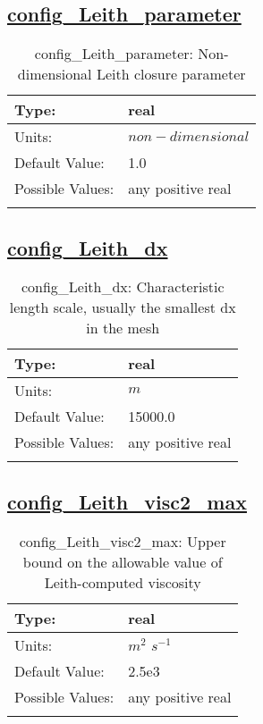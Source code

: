 \subsection[config\_Leith\_parameter]{\hyperref[sec:nm_tab_hmix_Leith]{config\_Leith\_parameter}}
\label{subsec:nm_sec_config_Leith_parameter}
\begin{center}
\begin{longtable}{| p{2.0in} | p{4.0in} |}
    \hline
    Type: & real \\
    \hline
    Units: & $non-dimensional$ \\
    \hline
    Default Value: & 1.0 \\
    \hline
    Possible Values: & any positive real \\
    \hline
    \caption{config\_Leith\_parameter: Non-dimensional Leith closure parameter}
\end{longtable}
\end{center}
\subsection[config\_Leith\_dx]{\hyperref[sec:nm_tab_hmix_Leith]{config\_Leith\_dx}}
\label{subsec:nm_sec_config_Leith_dx}
\begin{center}
\begin{longtable}{| p{2.0in} | p{4.0in} |}
    \hline
    Type: & real \\
    \hline
    Units: & $m$ \\
    \hline
    Default Value: & 15000.0 \\
    \hline
    Possible Values: & any positive real \\
    \hline
    \caption{config\_Leith\_dx: Characteristic length scale, usually the smallest dx in the mesh}
\end{longtable}
\end{center}
\subsection[config\_Leith\_visc2\_max]{\hyperref[sec:nm_tab_hmix_Leith]{config\_Leith\_visc2\_max}}
\label{subsec:nm_sec_config_Leith_visc2_max}
\begin{center}
\begin{longtable}{| p{2.0in} | p{4.0in} |}
    \hline
    Type: & real \\
    \hline
    Units: & $m^2$ $s^{-1}$ \\
    \hline
    Default Value: & 2.5e3 \\
    \hline
    Possible Values: & any positive real \\
    \hline
    \caption{config\_Leith\_visc2\_max: Upper bound on the allowable value of Leith-computed viscosity}
\end{longtable}
\end{center}

